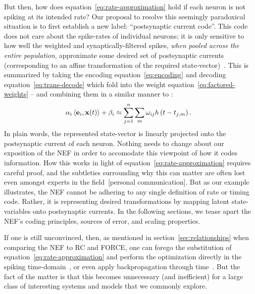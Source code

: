 But then, how does equation~\ref{eq:rate-approximation} hold if each neuron is not spiking at its intended rate?
Our proposal to resolve this seemingly paradoxical situation is to first establish a new label: ``postsynaptic current code''.
This code does not care about the spike-rates of individual neurons; it is only sensitive to how well the weighted and synaptically-filtered spikes, \emph{when pooled across the entire population}, approximate some desired set of postsynaptic currents (corresponding to an affine transformation of the required state-vector)~\citep{tripp2006neural}.
This is summarized by taking the encoding equation~\ref{eq:encoding} and decoding equation~\ref{eq:trans-decode} which fold into the weight equation~\ref{eq:factored-weights} -- and combining them in a similar manner to \citet{stoeckel2018}:
\begin{equation} \label{eq:psc-code}
\alpha_i \left\langle \mathbf{e}_i\text{,}\, \mathbf{x}(t) \right\rangle + \beta_i \approx \sum_{j=1}^n \sum_m \omega_{ij} h \left( t - t_{j\text{,}m} \right) \text{.}
\end{equation}
In plain words, the represented state-vector is linearly projected onto the postsynaptic current of each neuron. 
Nothing needs to change about our exposition of the NEF in order to accomodate this viewpoint of how it codes information.
How this works in light of equation~\ref{eq:rate-approximation} requires careful proof, and the subtleties surrounding why this can matter are often lost even amongst experts in the field~[personal communication].
But as our example illustrates, the NEF cannot be adhering to any single definition of rate or timing code.
Rather, it is representing desired transformations by mapping latent state-variables onto postsynaptic currents.  %
In the following sections, we tease apart the NEF's coding principles, sources of error, and scaling properties.

If one is still unconvinced, then, as mentioned in section~\ref{sec:relationships} when comparing the NEF to RC and FORCE, one can forego the substitution of equation~\ref{eq:rate-approximation} and perform the optimization directly in the spiking time-domain~\citep{voelker2016a, duggins2017incorporating}, or even apply backpropagation through time~\citep{rasmussen2018nengodl}.
But the fact of the matter is that this becomes unnecessary (and inefficient) for a large class of interesting systems and models that we commonly explore.

